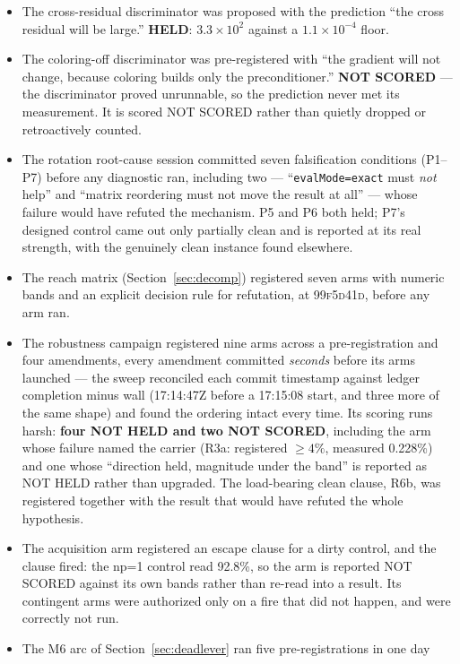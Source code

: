 \documentclass[11pt,a4paper]{article}
\newcommand{\commit}[1]{\textsc{\small #1}}
\begin{document}
\begin{itemize}
\item The cross-residual discriminator was proposed with the prediction ``the cross residual
will be large.'' \textbf{HELD}: \(3.3\times10^{2}\) against a \(1.1\times10^{-4}\) floor.
\item The coloring-off discriminator was pre-registered with ``the gradient will not change,
because coloring builds only the preconditioner.'' \textbf{NOT SCORED} --- the discriminator
proved unrunnable, so the prediction never met its measurement. It is scored NOT SCORED
rather than quietly dropped or retroactively counted.
\item The rotation root-cause session committed seven falsification conditions (P1--P7) before
any diagnostic ran, including two --- ``\texttt{evalMode=exact} must \emph{not} help'' and
``matrix reordering must not move the result at all'' --- whose failure would have refuted the
mechanism. P5 and P6 both held; P7's designed control came out only partially clean and is
reported at its real strength, with the genuinely clean instance found elsewhere.
\item The reach matrix (Section~\ref{sec:decomp}) registered seven arms with numeric bands and
an explicit decision rule for refutation, at \commit{99f5d41d}, before any arm ran.
\item The robustness campaign registered nine arms across a pre-registration and four
amendments, every amendment committed \emph{seconds} before its arms launched --- the sweep
reconciled each commit timestamp against ledger completion minus wall (17:14:47Z before a
17:15:08 start, and three more of the same shape) and found the ordering intact every time.
Its scoring runs harsh: \textbf{four NOT HELD and two NOT SCORED}, including the arm whose
failure named the carrier (R3a: registered \(\ge 4\%\), measured 0.228\%) and one whose
``direction held, magnitude under the band'' is reported as NOT HELD rather than upgraded. The
load-bearing clean clause, R6b, was registered together with the result that would have
refuted the whole hypothesis.
\item The acquisition arm registered an escape clause for a dirty control, and the clause
fired: the np=1 control read 92.8\%, so the arm is reported NOT SCORED against its own bands
rather than re-read into a result. Its contingent arms were authorized only on a fire that did
not happen, and were correctly not run.
\item The M6 arc of Section~\ref{sec:deadlever} ran five pre-registrations in one day

\end{itemize}
\end{document}
